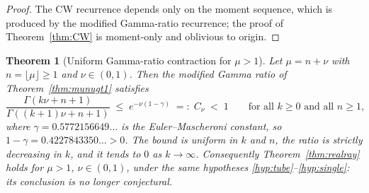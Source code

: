\documentclass[11pt]{article}
\newtheorem{theorem}{Theorem}[section]
\theoremstyle{definition}
\begin{document}
\begin{proof}
The CW recurrence depends only on the moment sequence, which is
produced by the modified Gamma-ratio recurrence; the proof of
Theorem~\ref{thm:CW} is moment-only and oblivious to origin.
\end{proof}

\begin{theorem}[Uniform Gamma-ratio contraction for $\mu>1$]\label{rem:conj}
Let $\mu = n+\nu$ with $n = \lfloor\mu\rfloor \geq 1$ and
$\nu \in (0,1)$. Then the modified Gamma ratio of
Theorem~\ref{thm:munugt1} satisfies
\[
\frac{\Gamma(k\nu+n+1)}{\Gamma((k+1)\nu+n+1)}
\;\leq\; e^{-\nu(1-\gamma)}
\;=:\; C_{\nu}
\;<\; 1
\qquad\text{for all } k \geq 0 \text{ and all } n \geq 1,
\]
where $\gamma = 0.5772156649\ldots$ is the Euler--Mascheroni
constant, so $1-\gamma = 0.4227843350\ldots > 0$. The bound is
uniform in $k$ and $n$, the ratio is strictly decreasing in $k$, and
it tends to $0$ as $k \to \infty$. Consequently
Theorem~\ref{thm:realray} holds for $\mu > 1$, $\nu \in (0,1)$, under
the same hypotheses \ref{hyp:tube}--\ref{hyp:single}: its conclusion
is no longer conjectural.
\end{theorem}
\end{document}
